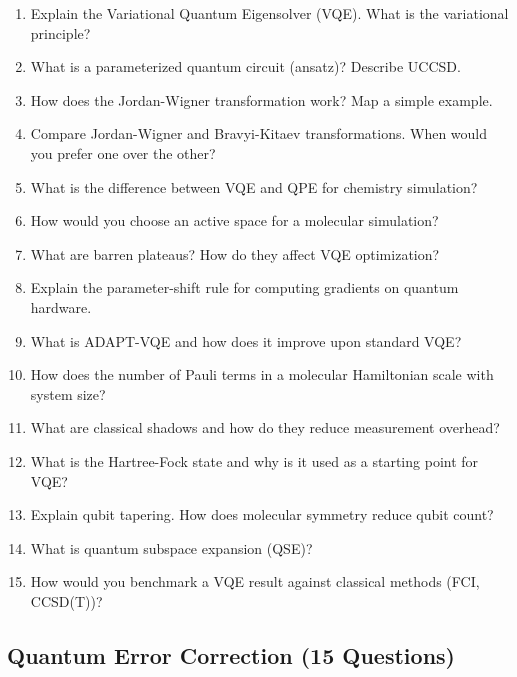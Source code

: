 \documentclass[11pt,a4paper]{article}
\begin{document}
\begin{questionbox}
\begin{enumerate}[label=\textbf{Q\arabic*.}, start=16]
    \item Explain the Variational Quantum Eigensolver (VQE). What is the variational principle?
    \item What is a parameterized quantum circuit (ansatz)? Describe UCCSD.
    \item How does the Jordan-Wigner transformation work? Map a simple example.
    \item Compare Jordan-Wigner and Bravyi-Kitaev transformations. When would you prefer one over the other?
    \item What is the difference between VQE and QPE for chemistry simulation?
    \item How would you choose an active space for a molecular simulation?
    \item What are barren plateaus? How do they affect VQE optimization?
    \item Explain the parameter-shift rule for computing gradients on quantum hardware.
    \item What is ADAPT-VQE and how does it improve upon standard VQE?
    \item How does the number of Pauli terms in a molecular Hamiltonian scale with system size?
    \item What are classical shadows and how do they reduce measurement overhead?
    \item What is the Hartree-Fock state and why is it used as a starting point for VQE?
    \item Explain qubit tapering. How does molecular symmetry reduce qubit count?
    \item What is quantum subspace expansion (QSE)?
    \item How would you benchmark a VQE result against classical methods (FCI, CCSD(T))?
\end{enumerate}
\end{questionbox}

\subsection{Quantum Error Correction (15 Questions)}
\end{document}
